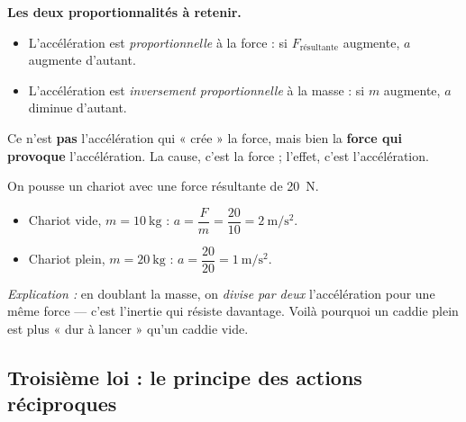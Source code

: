 \documentclass[11pt,a4paper]{article}
\newcommand{\vv}[1]{\vec{#1}}
\begin{document}
\noindent\textbf{Les deux proportionnalités à retenir.}
\begin{itemize}[leftmargin=1.6em,topsep=2pt]
  \item L'accélération est \emph{proportionnelle} à la force : si $F_{\text{résultante}}$ augmente, $a$ augmente d'autant.
  \item L'accélération est \emph{inversement proportionnelle} à la masse : si $m$ augmente, $a$ diminue d'autant.
\end{itemize}

\begin{center}
\end{center}

\begin{attention}
Ce n'est \textbf{pas} l'accélération qui « crée » la force, mais bien la \textbf{force qui provoque}
l'accélération. La cause, c'est la force ; l'effet, c'est l'accélération.
\end{attention}

\begin{exemple}
On pousse un chariot avec une force résultante de \qty{20}{\newton}.
\begin{itemize}[leftmargin=1.6em,topsep=2pt,itemsep=1pt]
  \item Chariot vide, $m=\qty{10}{\kilogram}$ : $a=\dfrac{F}{m}=\dfrac{20}{10}=\qty{2}{\metre\per\second\squared}$.
  \item Chariot plein, $m=\qty{20}{\kilogram}$ : $a=\dfrac{20}{20}=\qty{1}{\metre\per\second\squared}$.
\end{itemize}
\emph{Explication :} en doublant la masse, on \emph{divise par deux} l'accélération pour une même
force — c'est l'inertie qui résiste davantage. Voilà pourquoi un caddie plein est plus « dur à
lancer » qu'un caddie vide.
\end{exemple}

\subsection{Troisième loi : le principe des actions réciproques}
\end{document}
